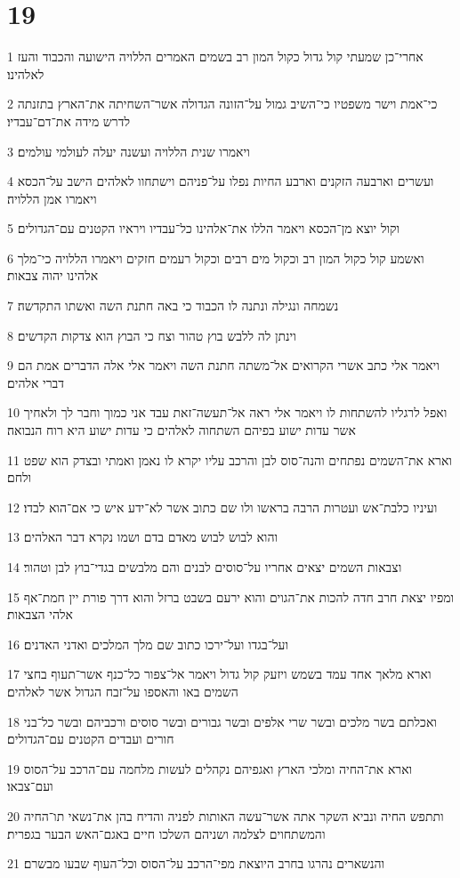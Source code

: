 \chapter{19}

\par 1 אחרי־כן שמעתי קול גדול כקול המון רב בשמים האמרים הללויה הישועה והכבוד והעז לאלהינו׃
\par 2 כי־אמת וישר משפטיו כי־השיב גמול על־הזונה הגדולה אשר־השחיתה את־הארץ בתזנתה לדרש מידה את־דם־עבדיו׃
\par 3 ויאמרו שנית הללויה ועשנה יעלה לעולמי עולמים׃
\par 4 ועשרים וארבעה הזקנים וארבע החיות נפלו על־פניהם וישתחוו לאלהים הישב על־הכסא ויאמרו אמן הללויה׃
\par 5 וקול יוצא מן־הכסא ויאמר הללו את־אלהינו כל־עבדיו ויראיו הקטנים עם־הגדולים׃
\par 6 ואשמע קול כקול המון רב וכקול מים רבים וכקול רעמים חזקים ויאמרו הללויה כי־מלך אלהינו יהוה צבאות׃
\par 7 נשמחה ונגילה ונתנה לו הכבוד כי באה חתנת השה ואשתו התקדשה׃
\par 8 וינתן לה ללבש בוץ טהור וצח כי הבוץ הוא צדקות הקדשים׃
\par 9 ויאמר אלי כתב אשרי הקרואים אל־משתה חתנת השה ויאמר אלי אלה הדברים אמת הם דברי אלהים׃
\par 10 ואפל לרגליו להשתחות לו ויאמר אלי ראה אל־תעשה־זאת עבד אני כמוך וחבר לך ולאחיך אשר עדות ישוע בפיהם השתחוה לאלהים כי עדות ישוע היא רוח הנבואה׃
\par 11 וארא את־השמים נפתחים והנה־סוס לבן והרכב עליו יקרא לו נאמן ואמתי ובצדק הוא שפט ולחם׃
\par 12 ועיניו כלבת־אש ועטרות הרבה בראשו ולו שם כתוב אשר לא־ידע איש כי אם־הוא לבדו׃
\par 13 והוא לבוש לבוש מאדם בדם ושמו נקרא דבר האלהים׃
\par 14 וצבאות השמים יצאים אחריו על־סוסים לבנים והם מלבשים בגדי־בוץ לבן וטהור׃
\par 15 ומפיו יצאת חרב חדה להכות את־הגוים והוא ירעם בשבט ברזל והוא דרך פורת יין חמת־אף אלהי הצבאות׃
\par 16 ועל־בגדו ועל־ירכו כתוב שם מלך המלכים ואדני האדנים׃
\par 17 וארא מלאך אחד עמד בשמש ויזעק קול גדול ויאמר אל־צפור כל־כנף אשר־תעוף בחצי השמים באו והאספו על־זבח הגדול אשר לאלהים׃
\par 18 ואכלתם בשר מלכים ובשר שרי אלפים ובשר גבורים ובשר סוסים ורכביהם ובשר כל־בני חורים ועבדים הקטנים עם־הגדולים׃
\par 19 וארא את־החיה ומלכי הארץ ואגפיהם נקהלים לעשות מלחמה עם־הרכב על־הסוס ועם־צבאו׃
\par 20 ותתפש החיה ונביא השקר אתה אשר־עשה האותות לפניה והדיח בהן את־נשאי תו־החיה והמשתחוים לצלמה ושניהם השלכו חיים באגם־האש הבער בגפרית׃
\par 21 והנשארים נהרגו בחרב היוצאת מפי־הרכב על־הסוס וכל־העוף שבעו מבשרם׃

